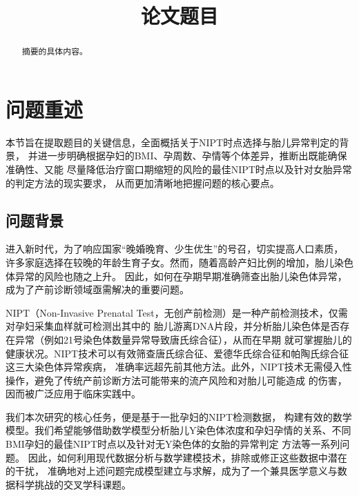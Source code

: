 \documentclass{cumcmthesis}
\title{论文题目}
\begin{document}
        \maketitle
        \begin{abstract}
            摘要的具体内容。
        \end{abstract}
        \section{问题重述}
        本节旨在提取题目的关键信息，全面概括关于NIPT时点选择与胎儿异常判定的背景，
        并进一步明确根据孕妇的BMI、孕周数、孕情等个体差异，推断出既能确保准确性、又能
        尽量降低治疗窗口期缩短的风险的最佳NIPT时点以及针对女胎异常的判定方法的现实要求，
        从而更加清晰地把握问题的核心要点。

        \subsection{问题背景}
        
        进入新时代，为了响应国家“晚婚晚育、少生优生”的号召，切实提高人口素质，
        许多家庭选择在较晚的年龄生育子女。然而，随着高龄产妇比例的增加，胎儿染色体异常的风险也随之上升。
        因此，如何在孕期早期准确筛查出胎儿染色体异常，成为了产前诊断领域亟需解决的重要问题。
        \par 
        NIPT（Non-Invasive Prenatal Test，无创产前检测）是一种产前检测技术，仅需对孕妇采集血样就可检测出其中的
        胎儿游离DNA片段，并分析胎儿染色体是否存在异常（例如21号染色体数量异常导致唐氏综合征），从而在早期
        就可掌握胎儿的健康状况。NIPT技术可以有效筛查唐氏综合征、爱德华氏综合征和帕陶氏综合征这三大染色体异常疾病，
        准确率远超先前其他方法。此外，NIPT技术无需侵入性操作，避免了传统产前诊断方法可能带来的流产风险和对胎儿可能造成
        的伤害，因而被广泛应用于临床实践中。
        \par 我们本次研究的核心任务，便是基于一批孕妇的NIPT检测数据，
        构建有效的数学模型。我们希望能够借助数学模型分析胎儿Y染色体浓度和孕妇孕情的关系、不同BMI孕妇的最佳NIPT时点以及针对无Y染色体的女胎的异常判定
        方法等一系列问题。
        因此，如何利用现代数据分析与数学建模技术，排除或修正这些数据中潜在的干扰，
        准确地对上述问题完成模型建立与求解，成为了一个兼具医学意义与数据科学挑战的交叉学科课题。
        
\end{document}
